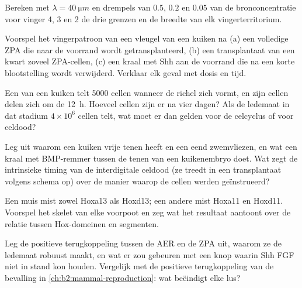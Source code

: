 \begin{exercise}[$\star\star$]\label{exo:b2:limb-organogenesis:5}
Bereken met $\lambda = \qty{40}{\micro m}$ en drempels van $0.5$, $0.2$
en $0.05$ van de bronconcentratie voor vinger 4, 3 en 2 de drie grenzen en
de breedte van elk vingerterritorium.
\end{exercise}

\begin{exercise}[$\star\star$]\label{exo:b2:limb-organogenesis:6}
Voorspel het vingerpatroon van een vleugel van een kuiken na (a) een
volledige ZPA die naar de voorrand wordt getransplanteerd, (b) een
transplantaat van een kwart zoveel ZPA-cellen, (c) een kraal met Shh aan de
voorrand die na een korte blootstelling wordt verwijderd. Verklaar elk
geval met dosis en tijd.
\end{exercise}

\begin{exercise}[$\star\star$]\label{exo:b2:limb-organogenesis:7}
Een  van een kuiken telt \num{5000} cellen wanneer de richel zich
vormt, en zijn cellen delen zich om de \qty{12}{h}. Hoeveel cellen zijn er
na vier dagen? Als de ledemaat in dat stadium $4\times 10^{6}$ cellen telt,
wat moet er dan gelden voor de celcyclus of voor celdood?
\end{exercise}

\begin{exercise}[$\star\star$]\label{exo:b2:limb-organogenesis:8}
Leg uit waarom een kuiken vrije tenen heeft en een eend zwemvliezen, en wat
een kraal met BMP-remmer tussen de tenen van een kuikenembryo doet. Wat zegt
de intrinsieke timing van de interdigitale celdood (ze treedt in een
transplantaat volgens schema op) over de manier waarop de cellen werden
geïnstrueerd?
\end{exercise}

\begin{exercise}[$\star\star$]\label{exo:b2:limb-organogenesis:9}
Een muis mist zowel Hoxa13 als Hoxd13; een andere mist Hoxa11 en
Hoxd11. Voorspel het skelet van elke voorpoot en zeg wat het resultaat
aantoont over de relatie tussen Hox-domeinen en segmenten.
\end{exercise}

\begin{exercise}[$\star\star\star$]\label{exo:b2:limb-organogenesis:10}
Leg de positieve terugkoppeling tussen de AER en de ZPA uit, waarom ze de
ledemaat robuust maakt, en wat er zou gebeuren met een knop waarin Shh FGF
niet in stand kon houden. Vergelijk met de positieve terugkoppeling van de
bevalling in \cref{ch:b2:mammal-reproduction}: wat beëindigt elke lus?
\end{exercise}

